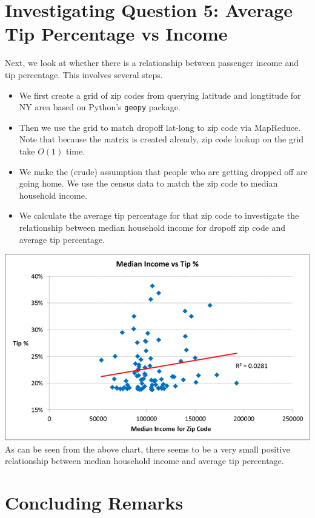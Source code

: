 \documentclass[twoside]{article}
\begin{document}
\begin{multicols}{2}
\section{Investigating Question 5: Average Tip Percentage vs Income}
Next, we look at whether there is a relationship between passenger income and tip percentage. This involves several steps.
\begin{itemize}
\item We first create a grid of zip codes from querying latitude and longtitude for NY area based on Python's \texttt{geopy} package.
\item Then we use the grid to match dropoff lat-long to zip code via MapReduce. Note that because the matrix is created already, zip code lookup on the grid take $O(1)$ time.
\item We make the (crude) assumption that people who are getting dropped off are going home. We use the census data to match the zip code to median household income.
\item We calculate the average tip percentage for that zip code to investigate the relationship between median household income for dropoff zip code and average tip percentage.
\end{itemize}

\includegraphics[scale=.4]{zip_income.png}
As can be seen from the above chart, there seems to be a very small positive relationship between median household income and average tip percentage.

\section{Concluding Remarks}


\end{multicols}
\end{document}
